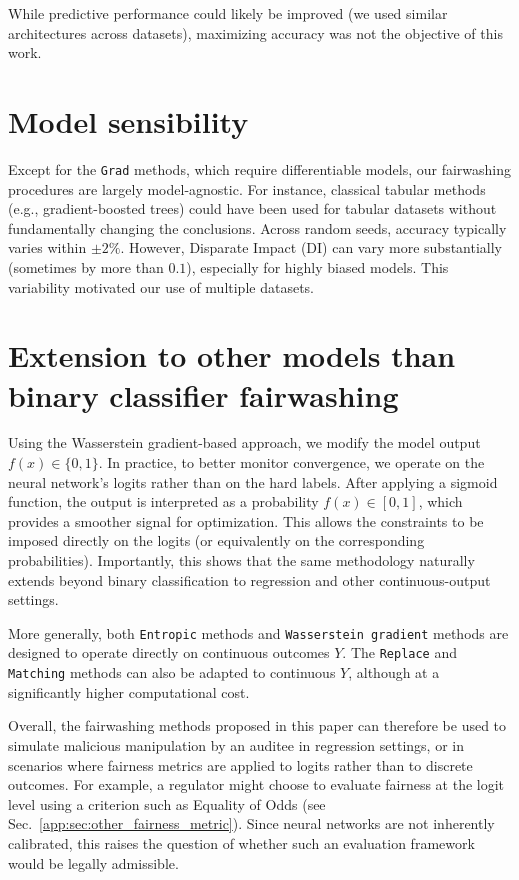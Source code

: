 \documentclass[runningheads, orivec]{llncs}
\begin{document}
While predictive performance could likely be improved (we used similar architectures across datasets), maximizing accuracy was not the objective of this work.

\section{Model sensibility}

Except for the \texttt{Grad} methods, which require differentiable models, our fairwashing procedures are largely model-agnostic. For instance, classical tabular methods (e.g., gradient-boosted trees) could have been used for tabular datasets without fundamentally changing the conclusions. Across random seeds, accuracy typically varies within $\pm 2\%$. However, Disparate Impact (DI) can vary more substantially (sometimes by more than $0.1$), especially for highly biased models. This variability motivated our use of multiple datasets.

\section{Extension to other models than binary classifier fairwashing}

Using the Wasserstein gradient-based approach, we modify the model output $f(x) \in \{0,1\}$. In practice, to better monitor convergence, we operate on the neural network’s logits rather than on the hard labels. After applying a sigmoid function, the output is interpreted as a probability $f(x) \in [0,1]$, which provides a smoother signal for optimization. This allows the constraints to be imposed directly on the logits 
(or equivalently on the corresponding probabilities). Importantly, this shows that the same methodology naturally extends beyond binary classification to regression and other continuous-output settings.

More generally, both \texttt{Entropic} methods and \texttt{Wasserstein gradient} methods are designed to operate directly on continuous outcomes $Y$. The \texttt{Replace} and \texttt{Matching} methods can also be adapted to continuous $Y$, although at a significantly higher computational cost.

Overall, the fairwashing methods proposed in this paper can therefore be used to simulate malicious manipulation by an auditee in regression settings, or in scenarios where fairness metrics are applied to logits rather than to discrete outcomes. For example, a regulator might choose to evaluate fairness at the logit level using a criterion such as Equality of Odds (see Sec.~\ref{app:sec:other_fairness_metric}). Since neural networks are not inherently calibrated, this raises the question of whether such an evaluation framework would be legally admissible.
\end{document}
